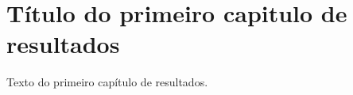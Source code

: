 \chapter{Título do primeiro capitulo de resultados}\label{capitulo3}

Texto do primeiro capítulo de resultados.